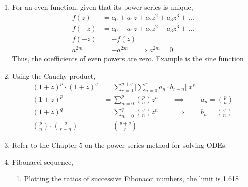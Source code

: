 \begin{enumerate}
    \item For an even function, given that its power series is unique,
          \begin{align}
              f(z)   & = a_0 + a_1 z + a_2 z^2 + a_3 z^3 + \dots \\
              f(-z)  & = a_0 - a_1 z + a_2 z^2 - a_3 z^3 + \dots \\
              f(-z)  & = -f(z)                                   \\
              a^{2m} & = -a^{2m} \quad \implies a^{2m} = 0
          \end{align}
          Thus, the coefficients of even powers are zero. Example is the sine function

    \item Using the Cauchy product,
          \begin{align}
              (1+z)^p \cdot (1+z)^q & = \sum_{r=0}^{p+q} \Bigg[\sum_{n=0}^{r}
              a_n \cdot b_{r-n}\Bigg]\ x^r                                     \\
              (1+z)^p               & = \sum_{n=0}^{p} \binom{p}{n} z^n \qquad
              \implies \qquad a_n = \binom{p}{n}                               \\
              (1+z)^q               & = \sum_{n=0}^{q} \binom{q}{n} z^n \qquad
              \implies \qquad b_n = \binom{q}{n}                               \\
              \binom{p}{n} \cdot \binom
              {q}{r-n}              & = \binom{p+q}{r}
          \end{align}

    \item Refer to the Chapter $ 5 $ on the power series method for solving ODEs.

    \item Fibonacci sequence,
          \begin{enumerate}
              \item Plotting the ratios of successive Fibonacci numbers, the limit is
                    1.618
                    \begin{figure}[H]
                        \centering
                        \anitablenine
                    \end{figure}


\end{enumerate}
\end{enumerate}
